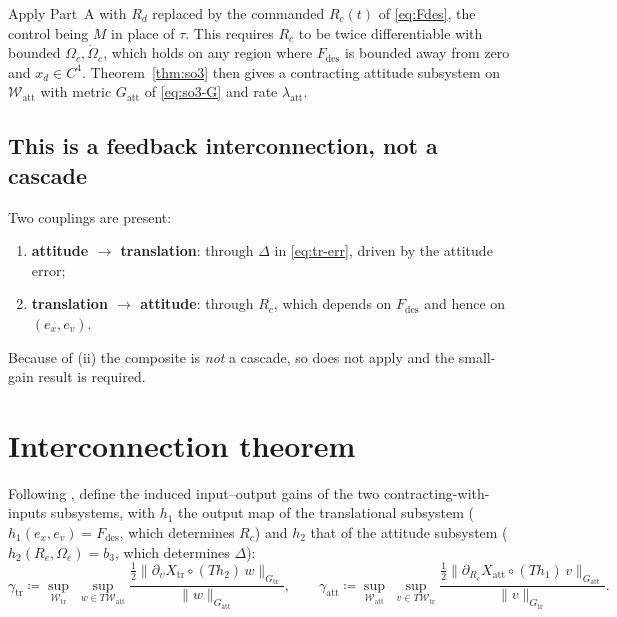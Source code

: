 \documentclass[11pt,a4paper]{article}
\newcommand{\norm}[1]{\lVert #1 \rVert}
\newcommand{\Ome}{\Omega_{\!e}}
\theoremstyle{plain}
\theoremstyle{definition}
\theoremstyle{remark}
\begin{document}
Apply Part~A with $R_d$ replaced by the commanded $R_c(t)$ of \eqref{eq:Fdes}, the
control being $M$ in place of $\tau$. This requires $R_c$ to be twice
differentiable with bounded $\Omega_c,\dot\Omega_c$, which holds on any region
where $F_{\mathrm{des}}$ is bounded away from zero and $x_d\in C^4$. Theorem~\ref{thm:so3}
then gives a contracting attitude subsystem on $\mathcal{W}_{\mathrm{att}}$ with
metric $G_{\mathrm{att}}$ of \eqref{eq:so3-G} and rate $\lambda_{\mathrm{att}}$.

\subsection{This is a feedback interconnection, not a cascade}

Two couplings are present:
\begin{enumerate}[label=(\roman*),leftmargin=2.1em,itemsep=2pt,topsep=2pt]
\item \textbf{attitude $\to$ translation}: through $\Delta$ in \eqref{eq:tr-err},
      driven by the attitude error;
\item \textbf{translation $\to$ attitude}: through $R_c$, which depends on
      $F_{\mathrm{des}}$ and hence on $(e_x,e_v)$.
\end{enumerate}
Because of (ii) the composite is \emph{not} a cascade, so \cite[Lem.~3.1]{SB13}
does not apply and the small-gain result \cite[Lem.~3.2]{SB13} is required.

\section{Interconnection theorem}
\label{sec:se3-main}

Following \cite[eq.~(11)]{SB13}, define the induced input--output gains of the two
contracting-with-inputs subsystems, with $h_1$ the output map of the translational
subsystem ($h_1(e_x,e_v) = F_{\mathrm{des}}$, which determines $R_c$) and $h_2$ that
of the attitude subsystem ($h_2(R_e,\Ome) = b_3$, which determines $\Delta$):
\begin{equation}
  \gamma_{\mathrm{tr}} \coloneqq
  \sup_{\mathcal{W}_{\mathrm{tr}}}\;\sup_{w\in T\mathcal{W}_{\mathrm{att}}}
  \frac{\tfrac12\big\|\partial_{\upsilon}X_{\mathrm{tr}}\circ (Th_2)\,w\big\|_{G_{\mathrm{tr}}}}
       {\norm{w}_{G_{\mathrm{att}}}},
  \qquad
  \gamma_{\mathrm{att}} \coloneqq
  \sup_{\mathcal{W}_{\mathrm{att}}}\;\sup_{v\in T\mathcal{W}_{\mathrm{tr}}}
  \frac{\tfrac12\big\|\partial_{R_c}X_{\mathrm{att}}\circ (Th_1)\,v\big\|_{G_{\mathrm{att}}}}
       {\norm{v}_{G_{\mathrm{tr}}}} .
  \label{eq:gains}
\end{equation}
\end{document}
